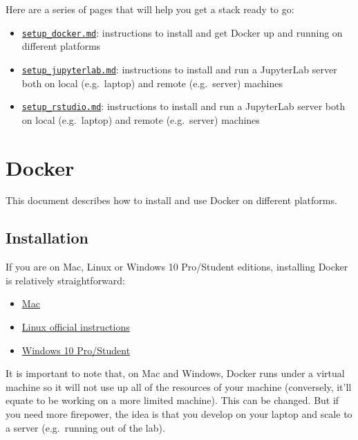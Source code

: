 \documentclass[
]{book}
\providecommand{\tightlist}{%
  \setlength{\itemsep}{0pt}\setlength{\parskip}{0pt}}
\begin{document}
Here are a series of pages that will help you get a stack ready to go:

\begin{itemize}
\tightlist
\item
  \href{setup_docker.md}{\texttt{setup\_docker.md}}: instructions to install and get Docker
  up and running on different platforms
\item
  \href{setup_jupyterlab.md}{\texttt{setup\_jupyterlab.md}}: instructions to install and
  run a JupyterLab server both on local (e.g.~laptop) and remote (e.g.~server)
  machines
\item
  \href{setup_rstudio.md}{\texttt{setup\_rstudio.md}}: instructions to install and
  run a JupyterLab server both on local (e.g.~laptop) and remote (e.g.~server)
  machines
\end{itemize}

\hypertarget{docker}{%
\chapter{Docker}\label{docker}}

This document describes how to install and use Docker on different platforms.

\hypertarget{installation}{%
\section{Installation}\label{installation}}

If you are on Mac, Linux or Windows 10 Pro/Student editions, installing Docker
is relatively straightforward:

\begin{itemize}
\tightlist
\item
  \href{https://docs.docker.com/docker-for-mac/}{Mac}
\item
  \href{https://docs.docker.com/install/linux/docker-ce/ubuntu/}{Linux official instructions}
\item
  \href{https://docs.docker.com/docker-for-windows/}{Windows 10 Pro/Student}
\end{itemize}

It is important to note that, on Mac and Windows, Docker runs under a virtual
machine so it will not use up all of the resources of your machine
(conversely, it'll equate to be working on a more limited machine). This can
be changed. But if you need more firepower, the idea is that you develop on
your laptop and scale to a server (e.g.~running out of the lab).
\end{document}
